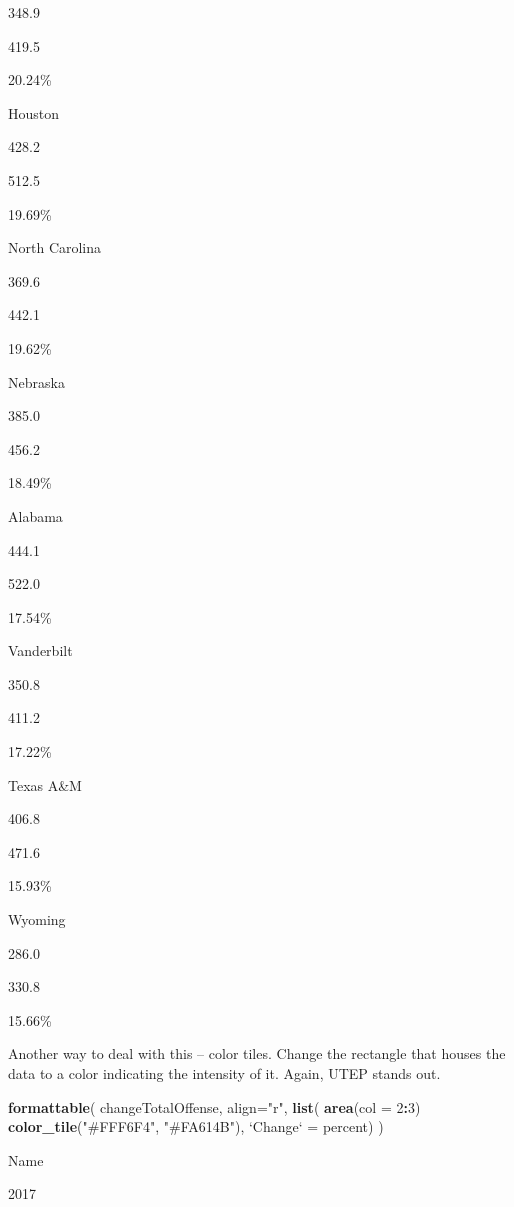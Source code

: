 \documentclass[]{book}
\newenvironment{Shaded}{\begin{snugshade}}{\end{snugshade}}
\newcommand{\KeywordTok}[1]{\textcolor[rgb]{0.13,0.29,0.53}{\textbf{#1}}}
\newcommand{\DataTypeTok}[1]{\textcolor[rgb]{0.13,0.29,0.53}{#1}}
\newcommand{\DecValTok}[1]{\textcolor[rgb]{0.00,0.00,0.81}{#1}}
\newcommand{\StringTok}[1]{\textcolor[rgb]{0.31,0.60,0.02}{#1}}
\newcommand{\OperatorTok}[1]{\textcolor[rgb]{0.81,0.36,0.00}{\textbf{#1}}}
\newcommand{\NormalTok}[1]{#1}
\begin{document}
{348.9}

{419.5}

20.24\%

Houston

{428.2}

{512.5}

19.69\%

North Carolina

{369.6}

{442.1}

19.62\%

Nebraska

{385.0}

{456.2}

18.49\%

Alabama

{444.1}

{522.0}

17.54\%

Vanderbilt

{350.8}

{411.2}

17.22\%

Texas A\&M

{406.8}

{471.6}

15.93\%

Wyoming

{286.0}

{330.8}

15.66\%

Another way to deal with this -- color tiles. Change the rectangle that
houses the data to a color indicating the intensity of it. Again, UTEP
stands out.

\begin{Shaded}
\begin{Highlighting}[]
\KeywordTok{formattable}\NormalTok{(}
\NormalTok{  changeTotalOffense, }
  \DataTypeTok{align=}\StringTok{"r"}\NormalTok{,}
  \KeywordTok{list}\NormalTok{(}
     \KeywordTok{area}\NormalTok{(}\DataTypeTok{col =} \DecValTok{2}\OperatorTok{:}\DecValTok{3}\NormalTok{) }\OperatorTok{~}\StringTok{ }\KeywordTok{color_tile}\NormalTok{(}\StringTok{"#FFF6F4"}\NormalTok{, }\StringTok{"#FA614B"}\NormalTok{),}
    \StringTok{`}\DataTypeTok{Change}\StringTok{`}\NormalTok{ =}\StringTok{ }\NormalTok{percent)}
\NormalTok{  )}
\end{Highlighting}
\end{Shaded}

Name

2017
\end{document}
